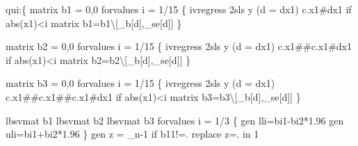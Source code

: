 \documentclass[
  letterpaper,
  DIV=11,
  numbers=noendperiod]{scrartcl}
\newenvironment{Shaded}{\begin{snugshade}}{\end{snugshade}}
\newcommand{\DataTypeTok}[1]{\textcolor[rgb]{0.68,0.00,0.00}{#1}}
\newcommand{\FunctionTok}[1]{\textcolor[rgb]{0.28,0.35,0.67}{#1}}
\newcommand{\KeywordTok}[1]{\textcolor[rgb]{0.00,0.23,0.31}{#1}}
\newcommand{\NormalTok}[1]{\textcolor[rgb]{0.00,0.23,0.31}{#1}}
\newcommand{\OtherTok}[1]{\textcolor[rgb]{0.00,0.23,0.31}{#1}}
\begin{document}
\begin{Shaded}
\begin{Highlighting}[]
\KeywordTok{qui}\NormalTok{:\{   }
\FunctionTok{matrix}\NormalTok{ b1 = 0,0}
\KeywordTok{forvalues}\NormalTok{ i = 1/15 \{}
\NormalTok{    ivregress 2sls }\FunctionTok{y}\NormalTok{ (}\KeywordTok{d}\NormalTok{ = dx1) c.x1\#dx1  }\KeywordTok{if} \FunctionTok{abs}\NormalTok{(x1)\textless{}}\OtherTok{\textasciigrave{}i\textquotesingle{}}
    \FunctionTok{matrix}\NormalTok{ b1=b1\textbackslash{}[\_b[}\KeywordTok{d}\NormalTok{],\_se[}\KeywordTok{d}\NormalTok{]]}
\NormalTok{\}}

\FunctionTok{matrix}\NormalTok{ b2 = 0,0}
\KeywordTok{forvalues}\NormalTok{ i = 1/15 \{}
\NormalTok{    ivregress 2sls }\FunctionTok{y}\NormalTok{ (}\KeywordTok{d}\NormalTok{ = dx1) c.x1\#\#c.x1\#dx1  }\KeywordTok{if} \FunctionTok{abs}\NormalTok{(x1)\textless{}}\OtherTok{\textasciigrave{}i\textquotesingle{}}
    \FunctionTok{matrix}\NormalTok{ b2=b2\textbackslash{}[\_b[}\KeywordTok{d}\NormalTok{],\_se[}\KeywordTok{d}\NormalTok{]]}
\NormalTok{\}}

\FunctionTok{matrix}\NormalTok{ b3 = 0,0}
\KeywordTok{forvalues}\NormalTok{ i = 1/15 \{}
\NormalTok{    ivregress 2sls }\FunctionTok{y}\NormalTok{ (}\KeywordTok{d}\NormalTok{ = dx1) c.x1\#\#c.x1\#\#c.x1\#dx1  }\KeywordTok{if} \FunctionTok{abs}\NormalTok{(x1)\textless{}}\OtherTok{\textasciigrave{}i\textquotesingle{}}
    \FunctionTok{matrix}\NormalTok{ b3=b3\textbackslash{}[\_b[}\KeywordTok{d}\NormalTok{],\_se[}\KeywordTok{d}\NormalTok{]]}
\NormalTok{\}}

\NormalTok{lbsvmat b1}
\NormalTok{lbsvmat b2}
\NormalTok{lbsvmat b3}
\KeywordTok{forvalues}\NormalTok{ i = 1/3 \{}
  \KeywordTok{gen}\NormalTok{ ll}\OtherTok{\textasciigrave{}i\textquotesingle{}}\NormalTok{=b}\OtherTok{\textasciigrave{}i\textquotesingle{}}\NormalTok{1{-}b}\OtherTok{\textasciigrave{}i\textquotesingle{}}\NormalTok{2*1.96}
  \KeywordTok{gen}\NormalTok{ ul}\OtherTok{\textasciigrave{}i\textquotesingle{}}\NormalTok{=b}\OtherTok{\textasciigrave{}i\textquotesingle{}}\NormalTok{1+b}\OtherTok{\textasciigrave{}i\textquotesingle{}}\NormalTok{2*1.96}
\NormalTok{\}}
\KeywordTok{gen}\NormalTok{ z = }\DataTypeTok{\_n}\NormalTok{{-}1 }\KeywordTok{if}\NormalTok{ b11!=.}
\KeywordTok{replace}\NormalTok{ z=. }\KeywordTok{in}\NormalTok{ 1}


\end{Highlighting}
\end{Shaded}
\end{document}
